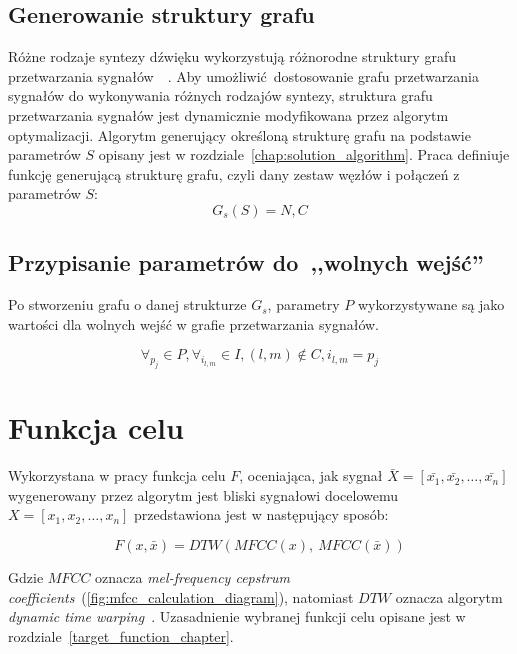 \subsection{Generowanie struktury grafu}\label{sec:graph_structure_definition}

Różne rodzaje syntezy dźwięku wykorzystują różnorodne struktury grafu przetwarzania
sygnałów~\cite{minilogue_diagram}~\cite{digitone_manual}.
Aby umożliwić dostosowanie grafu przetwarzania sygnałów do wykonywania różnych
rodzajów syntezy, struktura grafu przetwarzania sygnałów jest dynamicznie
modyfikowana przez algorytm optymalizacji. Algorytm generujący określoną
strukturę grafu na podstawie parametrów $S$ opisany jest w rozdziale~\ref{chap:solution_algorithm}.
Praca definiuje funkcję generującą strukturę grafu, czyli dany zestaw węzłów
i połączeń z parametrów $S$:
\begin{equation}
  G_s(S) = N, C
  \label{eq:graph_structure_generation_function}
\end{equation}

\subsection{Przypisanie parametrów do~,,wolnych wejść''}\label{sec:graph_params_definition}

Po stworzeniu grafu o danej strukturze $G_s$, parametry $P$ wykorzystywane
są jako wartości dla wolnych wejść w grafie przetwarzania
sygnałów.

\begin{equation}
  \forall_{p_j} \in P, \forall_{i_{l,m}} \in I,  (l, m) \notin C, i_{l,m} = p_j
  \label{eq:graph_params_assignment}
\end{equation}

\section{Funkcja celu}

Wykorzystana w pracy funkcja celu $F$, oceniająca, jak sygnał
$\bar{X} = [\bar{x_1}, \bar{x_2}, \ldots, \bar{x_n}]$ wygenerowany przez algorytm
jest bliski sygnałowi docelowemu $X = [x_1, x_2, \ldots, x_n]$
przedstawiona jest w następujący sposób:

\begin{equation}
  F(x, \bar{x}) = DTW(MFCC(x),~MFCC(\bar{x}))
  \label{eq:target_function}
\end{equation}

\noindent
Gdzie $MFCC$ oznacza \textit{mel-frequency cepstrum coefficients}~(\ref{fig:mfcc_calculation_diagram}),
natomiast $DTW$ oznacza algorytm \textit{dynamic time warping}~\cite{mfcc_dtw}.
Uzasadnienie wybranej funkcji celu opisane jest w rozdziale~\ref{target_function_chapter}.

